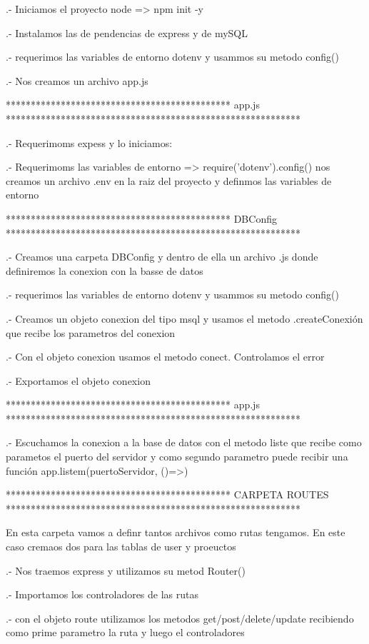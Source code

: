 .- Iniciamos el proyecto node => npm init -y

.- Instalamos las de pendencias de express y de mySQL

.- requerimos las variables de entorno  dotenv y usammos su metodo config()

.- Nos creamos un archivo app.js

********************************************* app.js ***********************************************************

.- Requerimoms expess y lo iniciamos:
        
.- Requerimoms las variables de entorno => require('dotenv').config()
   nos creamos un archivo .env en la raiz del proyecto y definmos las variables de entorno 

********************************************* DBConfig ***********************************************************   

.- Creamos una carpeta DBConfig y dentro de ella un archivo .js donde definiremos la conexion con la basse de datos

.- requerimos las variables de entorno  dotenv y usammos su metodo config()

.- Creamos un objeto conexion del tipo msql y usamos el metodo .createConexión que recibe los parametros del conexion

.- Con el objeto conexion usamos el metodo conect. Controlamos el error

.- Exportamos el objeto conexion

********************************************* app.js ***********************************************************

.- Escuchamos la conexion a la base de datos con el metodo liste que recibe como parametos el puerto del servidor y 
   como segundo parametro puede recibir una función
        app.listem(puertoServidor, ()=>{})

 
********************************************* CARPETA ROUTES ***********************************************************

En esta carpeta vamos a definr tantos archivos como rutas tengamos. En este caso cremaos dos para las tablas de user y proeuctos

.- Nos traemos express y utilizamos su metod Router()

.- Importamos los controladores de las rutas

.- con el objeto route utilizamos los metodos get/post/delete/update recibiendo como prime parametro la ruta y luego el controladores

